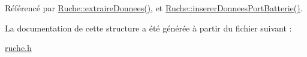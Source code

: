 Référencé par \hyperlink{class_ruche_a21c0dafeaec03d451590037343e6a3ca}{Ruche\+::extraire\+Donnees()}, et \hyperlink{class_ruche_a509367d6b2bcb7e6431fc1cc5ff606b5}{Ruche\+::inserer\+Donnees\+Port\+Batterie()}.



La documentation de cette structure a été générée à partir du fichier suivant \+:\begin{DoxyCompactItemize}
\item 
\hyperlink{ruche_8h}{ruche.\+h}\end{DoxyCompactItemize}
